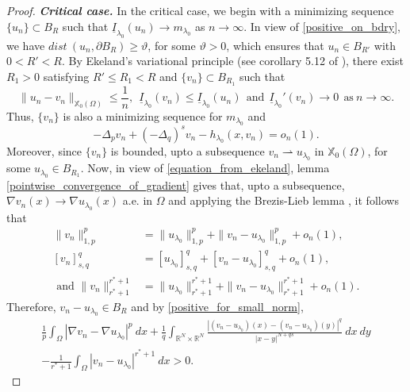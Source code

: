 \documentclass[reqno,oneside]{amsart}
\theoremstyle{definition}
\theoremstyle{remark}
\numberwithin{equation}{section}
\newcommand{\Om} {\Omega}
\newcommand{\sr}{\mathbb{R}}
\newcommand{\p}{\Delta_p}
\newcommand{\qs}{(-\Delta_q)^s}
\newcommand{\pa}{\partial}
\newcommand{\rar}{\rightarrow}
\newcommand{\na} {\nabla}
\newcommand{\xo}{\mathbb{X}_0}
\newcommand{\il}{\underline{I}}
\newcommand{\la} {\lambda}
\begin{document}
\begin{proof}
    \noindent\textbf{\textit{Critical case.}} In the critical case, we begin with a minimizing sequence $\{u_n\} \subset B_R$ such that $\il_{\la_0} (u_n) \rar m_{\la_0}$ as $n\rar\infty$. In view of \eqref{positive_on_bdry}, we have $dist\ (u_n, \pa B_R) \geq \vartheta$, for some $\vartheta>0$, which ensures that $u_n \in B_{R'}$ with $0< R' <R$. By Ekeland's variational principle (see corollary 5.12 of \cite{motreanu2014book}), there exist $R_1 >0$ satisfying $R' \leq R_1 <R$ and $\{v_n\}\subset B_{R_1}$ such that
    \begin{equation}\label{Ekeland's_variational_principle}
        \|u_n - v_n\|_{\xo(\Om)} \leq \frac{1}{n},\ \ \il_{\la_0} (v_n) \leq \il_{\la_0} (u_n)\ \ \text{and}\ \ \il_{\la_0}' (v_n) \rar 0\ \ \text{as}\ n\rar\infty.
    \end{equation}
    Thus, $\{v_n\}$ is also a minimizing sequence for $m_{\la_0}$ and
    \begin{equation}\label{equation_from_ekeland}
        -\p v_n + \qs v_n - h_{\la_0} (x, v_n) = o_n (1).
    \end{equation}
    Moreover, since $\{v_n\}$ is bounded, upto a subsequence $v_n \rightharpoonup u_{\la_0}$ in $\xo (\Om)$, for some $u_{\la_0} \in B_{R_1}$. Now, in view of \eqref{equation_from_ekeland}, lemma \ref{pointwise_convergence_of_gradient} gives that, upto a subsequence, $\na v_n (x) \rar \na u_{\la_0} (x)$ a.e. in $\Om$ and applying the Brezis-Lieb lemma \cite{brezis1983lieb}, it follows that
    \begin{equation}
        \begin{aligned}
            \|v_n\|^p_{1,p} &= \|u_{\la_0}\|^p_{1,p} + \|v_n - u_{\la_0}\|^p_{1,p} + o_n(1),\\[3mm]
            [v_n]^q_{s,q} &= [u_{\la_0}]^q_{s,q} + [v_n - u_{\la_0}]^q_{s,q} + o_n(1),\\[3mm]
            \text{ and } \|v_n\|^{r^* +1}_{r^* +1} &=  \|u_{\la_0} \|^{r^* +1}_{r^* +1} + \|v_n - u_{\la_0} \|^{r^* +1}_{r^* +1} +o_n(1).
        \end{aligned}
    \end{equation}
    Therefore, $v_n - u_{\la_0} \in B_R$ and by \eqref{positive_for_small_norm},
    \begin{multline}
        \frac{1}{p} \int_{\Om} |\na v_n - \na u_{\la_0}|^p\ dx + \frac{1}{q} \int_{\sr^N \times \sr^N} \frac{\left|\left(v_n - u_{\la_0}\right)(x)- \left(v_n - u_{\la_0}\right)(y) \right|^q}{|x-y|^{N+qs}}\ dx\ dy\\
        - \frac{1}{r^* +1} \int_{\Om} |v_n - u_{\la_0}|^{r^* +1}\ dx >0.

\end{multline}
\end{proof}
\end{document}

